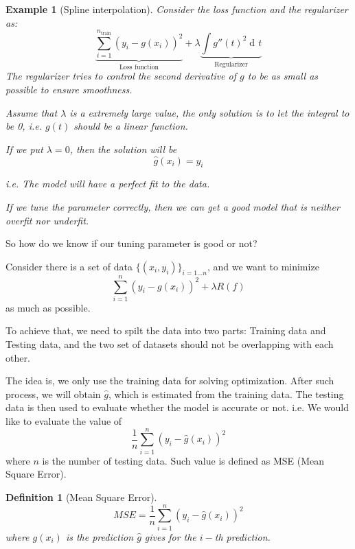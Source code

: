 \documentclass{article}
\theoremstyle{MyNonumberplain}
\theoremstyle{break}
\newcommand{\der}{\operatorname{d\!}{}}
\theoremstyle{break}
\newtheorem{example}{Example}[section]
\theoremstyle{break}
\theoremstyle{break}
\newtheorem{definition}{Definition}[section]
\begin{document}
\begin{expbox}
    \begin{example}[Spline interpolation]
        Consider the loss function and the regularizer as: $$\underbrace{\sum_{i=1}^{n_{\text{train}}}(y_i-g(x_i))^2}_{\text{Loss function}}+\lambda\underbrace{\int g''(t)^2\der t}_{\text{Regularizer}}$$
        \medskip
        The regularizer tries to control the second derivative of $g$ to be as small as possible to ensure smoothness.
        
        Assume that $\lambda$ is a extremely large value, the only solution is to let the integral to be 0, i.e. $g(t)$ should 
        be a linear function.
        \medskip

        If we put $\lambda=0$, then the solution will be $$\hat{g}(x_i)=y_i$$

        i.e. The model will have a perfect fit to the data.
        \medskip

        If we tune the parameter correctly, then we can get a good model that is neither overfit nor underfit.
    \end{example}
\end{expbox}

So how do we know if our tuning parameter is good or not?

Consider there is a set of data $\{(x_i,y_i)\}_{i=1...n}$, and we want to minimize $$\sum_{i=1}^{n}(y_i-g(x_i))^2+\lambda R(f)$$ as much as possible.

To achieve that, we need to spilt the data into two parts: Training data and Testing data, and the two set of datasets
should not be overlapping with each other.

The idea is, we only use the training data for solving optimization. After such process, we will 
obtain $\hat{g}$, which is estimated from the training data. The testing data is then used to evaluate whether the model is accurate or not. i.e. We would like to 
evaluate the value of $$\frac{1}{n}\sum_{i=1}^{n}(y_i-\hat{g}(x_i))^2$$
where $n$ is the number of testing data. Such value is defined as MSE (Mean Square Error).

\begin{defbox}
    \begin{definition}[Mean Square Error]
        $$MSE=\frac{1}{n}\sum_{i=1}^{n}(y_i-\hat{g}(x_i))^2$$ where $g(x_i)$ is 
        the prediction $\hat{g}$ gives for the $i-$th prediction.
    \end{definition}
\end{defbox}
\end{document}
